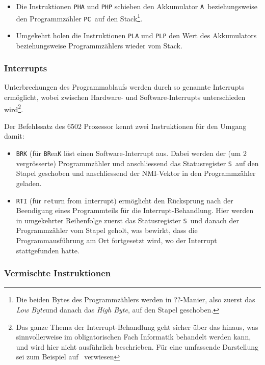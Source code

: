 \documentclass[11pt]{scrartcl}
\newcommand{\acc}{\texttt{A}}
\newcommand{\sreg}{\texttt{S}}
\newcommand{\pc}{\texttt{PC}}
\newcommand{\lobyte}{\emph{Low Byte}}
\newcommand{\hibyte}{\emph{High Byte}}
\begin{document}
\begin{itemize}
\item Die Instruktionen \lstinline|PHA| und \lstinline|PHP| schieben
  den Akkumulator \acc\ beziehungsweise den Programmzähler \pc\ auf
  den Stack\footnote{Die beiden Bytes des Programmzählers werden in
    ??-Manier, also zuerst das \lobyte und danach das \hibyte, auf den
    Stapel geschoben.}.
\item Umgekehrt holen die Instruktionen \lstinline|PLA| und
  \lstinline|PLP| den Wert des Akkumulators beziehungsweise
  Programmzählers wieder vom Stack.
\end{itemize}

\subsubsection{Interrupts}
\label{sec:interrupts}

Unterbrechungen des Programmablaufs werden durch so genannte
Interrupts ermöglicht, wobei zwischen Hardware- und
Software-Interrupts unterschieden wird\footnote{Das ganze Thema der
  Interrupt-Behandlung geht sicher über das hinaus, was sinnvollerweise
  im obligatorischen Fach Informatik behandelt werden kann, und wird
  hier nicht ausführlich beschrieben. Für eine umfassende Darstellung
  sei zum Beispiel auf~\cite{6502org_interrupts} verwiesen}.

Der Befehlssatz des 6502 Prozessor kennt zwei Instruktionen für den
Umgang damit:

\begin{itemize}
\item \lstinline|BRK| (für \texttt{BR}ea\texttt{K} löst einen
  Software-Interrupt aus. Dabei werden der (um 2 vergrösserte)
  Programmzähler und anschliessend das Statusregister \sreg\ auf den
  Stapel geschoben und anschliessend der NMI-Vektor in den
  Programmzähler geladen.

\item \lstinline|RTI| (für \texttt{r}e\texttt{t}urn from
  \texttt{i}nterrupt) ermöglicht den Rücksprung nach der Beendigung
  eines Programmteils für die Interrupt-Behandlung. Hier werden in
  umgekehrter Reihenfolge zuerst das Statusregister \sreg\ und danach
  der Programmzähler vom Stapel geholt, was bewirkt, dass die
  Programmausführung am Ort fortgesetzt wird, wo der Interrupt  stattgefunden hatte.
\end{itemize}

\subsubsection{Vermischte Instruktionen}
\label{sec:misc_instructions}
\end{document}
